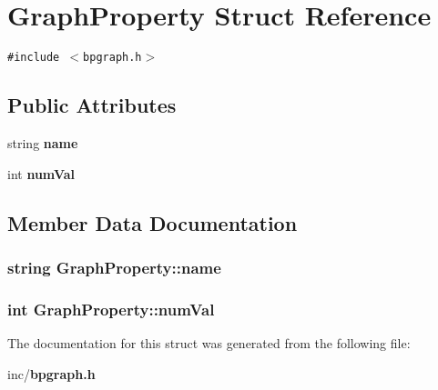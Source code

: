 \section{GraphProperty Struct Reference}
\label{structGraphProperty}
{\tt \#include $<$bpgraph.h$>$}

\subsection*{Public Attributes}
\begin{CompactItemize}
\item 
string {\bf name}
\item 
int {\bf numVal}
\end{CompactItemize}


\subsection{Member Data Documentation}
\subsubsection{\setlength{\rightskip}{0pt plus 5cm}string {\bf GraphProperty::name}}\label{structGraphProperty_be7e304528e5cfc9b0a49f75c12d1bed}


\subsubsection{\setlength{\rightskip}{0pt plus 5cm}int {\bf GraphProperty::numVal}}\label{structGraphProperty_429b5800a147bc2f897ed9e03f87a5a8}




The documentation for this struct was generated from the following file:\begin{CompactItemize}
\item 
inc/{\bf bpgraph.h}\end{CompactItemize}
